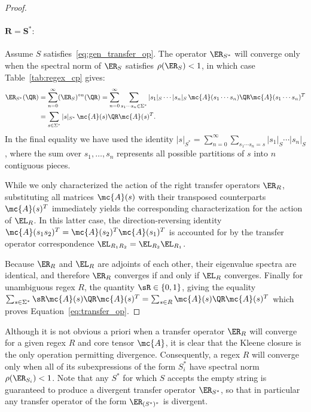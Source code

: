 \begin{proof}
\paragraph{$\mathbf{R = S^*:}$} Assume $S$ satisfies~\eqref{eq:gen_transfer_op}. The operator $\ER_{S^*}$ will converge only when the spectral norm of $\ER_S$ satisfies $\rho(\ER_S) < 1$, in which case Table~\ref{tab:regex_cp} 
gives:
%
\begin{align*}
    \ER_{S^*}(\QR) &= \sum_{n=0}^\infty (\ER_{S})^{\circ n}(\QR) = \sum_{n=0}^\infty \sum_{s_1\cdots s_n \in \Sigma^*} |s_1|_{S} \cdots |s_n|_S\, \mc{A}(s_1 \cdots s_n) \QR \mc{A}(s_1 \cdots s_n)^T \\
    &= \sum_{s \in \Sigma^*} |s|_{S^*}\, \mc{A}(s) \QR \mc{A}(s)^T.
\end{align*}
%
In the final equality we have used the identity $|s|_{S^*} = \sum_{n=0}^\infty \sum_{s_1 \cdots s_n = s} |s_1|_{S} \cdots |s_n|_{S}$, where the sum over $s_1, \ldots, s_n$ represents all possible partitions of $s$ into $n$ contiguous pieces. 

While we only characterized the action of the right transfer operators $\ER_R$, substituting all matrices $\mc{A}(s)$ with their transposed counterparts $\mc{A}(s)^T$ immediately yields the corresponding characterization for the action of $\EL_R$. In this latter case, the direction-reversing identity $\mc{A}(s_1 s_2)^T = \mc{A}(s_2)^T \mc{A}(s_1)^T$ is accounted for by the transfer operator correspondence $\EL_{R_1 R_2} = \EL_{R_2}\EL_{R_1}$. 

Because $\ER_R$ and $\EL_R$ are adjoints of each other, their eigenvalue spectra are identical, and therefore $\ER_R$ converges if and only if $\EL_R$ converges. Finally for unambiguous regex $R$, the quantity $\sR \in \{0, 1\}$, giving the equality $\sum_{s\in \Sigma^*} \sR \mc{A}(s) \QR \mc{A}(s)^T = \sum_{s\in R} \mc{A}(s) \QR \mc{A}(s)^T$ which proves Equation~\ref{eq:transfer_op}.
   
\end{proof}

Although it is not obvious a priori when a transfer operator $\ER_R$ will converge for a given regex $R$ and core tensor $\mc{A}$, it is clear that the Kleene closure is the only operation permitting divergence. Consequently, a regex $R$ will converge only when all of its subexpressions of the form $S_i^*$ have spectral norm $\rho(\ER_{S_i}) < 1$. Note that any $S^*$ for which $S$ accepts the empty string is guaranteed to produce a divergent transfer operator $\ER_{S^*}$, so that in particular any transfer operator of the form $\ER_{(S^*)^*}$ is divergent.

